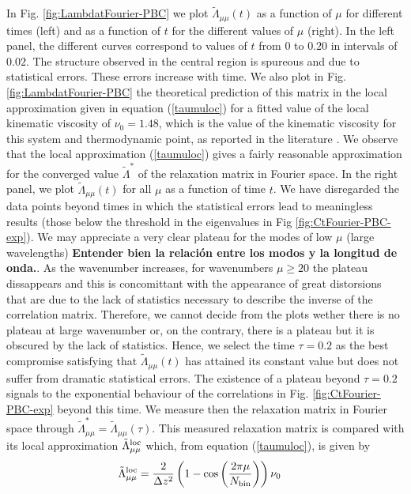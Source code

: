 \documentclass[b5paper,openright,10pt]{book}
\newcommand{\Note}[1]{{\bf \color{red}#1}}    %
\begin{document}
In       Fig.         \ref{fig:LambdatFourier-PBC}       we       plot
$\tilde{\Lambda}_{\mu\mu}(t)$  as a  function of  $\mu$ for  different
times (left) and as a function of $t$ for the different values of $\mu$
(right). In the left panel,  the different curves correspond to values
of  $t$ from  $0$ to  $0.20$ in  intervals of  $0.02$.  The  structure
observed  in the  central region  is spureous  and due  to statistical
errors.   These   errors  increase  with   time.   We  also   plot  in
Fig. \ref{fig:LambdatFourier-PBC}  the theoretical prediction  of this
matrix in the local approximation  given in equation (\ref{taumuloc}) for a
fitted value  of the  local kinematic  viscosity of  $\nu_0=1.48$, which is the value of the kinematic viscosity for this system and thermodynamic point, as reported in the literature \cite{Woodcock2006}. We
observe that  the local approximation (\ref{taumuloc})  gives a fairly
reasonable approximation  for the converged  value $\tilde{\Lambda}^*$
of the  relaxation matrix in Fourier  space.  In the right  panel, we
plot $\tilde{\Lambda}_{\mu\mu}(t)$ for all $\mu$ as a function of time
$t$.  We  have disregarded the data  points beyond times in  which the
statistical  errors  lead  to  meaningless results  (those  below  the
threshold  in  the  eigenvalues  in Fig  \ref{fig:CtFourier-PBC-exp}).   We  may
appreciate a  very clear  plateau for  the modes  of low  $\mu$ (large
wavelengths) \Note{Entender bien la relación entre los modos y la longitud de onda.}.  As the wavenumber increases, for wavenumbers $\mu\ge20$
the plateau dissappears  and this is concomittant  with the appearance
of great distorsions that are due  to the lack of statistics necessary
to describe  the inverse  of the correlation matrix.  Therefore, we  cannot decide
from the plots  wether there is no plateau at  large wavenumber or, on
the contrary,  there is a  plateau but it is  obscured by the  lack of
statistics. 
Hence, we select the  time $\tau=0.2$ as
the best compromise  satisfying that $\tilde{\Lambda}_{\mu\mu}(t)$ has
attained  its  constant  value  but  does  not  suffer  from  dramatic
statistical errors.     The existence  of a  plateau
beyond  $\tau=0.2$  signals  to   the  exponential  behaviour  of  the
correlations  in  Fig.   \ref{fig:CtFourier-PBC-exp}  beyond  this  time.   We
measure  then   the  relaxation   matrix  in  Fourier   space  through
$\tilde{\Lambda}^*_{\mu\mu}=\tilde{\Lambda}_{\mu\mu}(\tau)$.      This
measured relaxation  matrix is  compared with its  local approximation
$\tilde{\Lambda}^{\rm loc}_{\mu\mu}$ which, from equation (\ref{taumuloc}),
is given by
\begin{align}
\tilde{\Lambda}^{\rm loc}_{\mu\mu}&=\frac{2}{\Delta z^2}
\left(1-\cos\left( \frac{2\pi \mu}{N_{\rm bin}}\right)\right)
\nu_0
\label{Lambdaloc}
\end{align}
\end{document}
